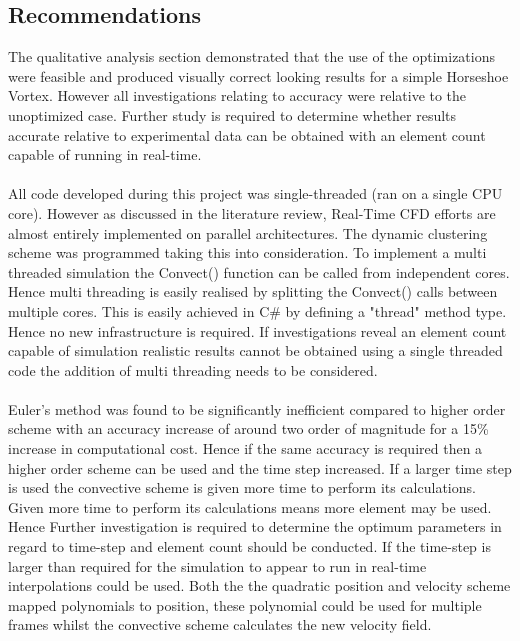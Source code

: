 \subsection{Recommendations}
The qualitative analysis section demonstrated that the use of the optimizations were feasible and produced visually correct looking results for a simple Horseshoe Vortex. However all investigations relating to accuracy were relative to the unoptimized case. Further study is required to determine whether results accurate relative to experimental data can be obtained with an element count capable of running in real-time.
\\\\
All code developed during this project was single-threaded (ran on a single CPU core). However as discussed in the literature review, Real-Time CFD efforts are almost entirely implemented on parallel architectures. The dynamic clustering scheme was programmed taking this into consideration. To implement a multi threaded simulation the Convect() function can be called from independent cores. Hence multi threading is easily realised by splitting the Convect() calls between multiple cores. This is easily achieved in C\# by defining a "thread" method type. Hence no new infrastructure is required. If investigations reveal an element count capable of simulation realistic results cannot be obtained using a single threaded code the addition of multi threading needs to be considered.
\\\\
Euler's method was found to be significantly inefficient compared to higher order scheme with an accuracy increase of around two order of magnitude for a 15\% increase in computational cost. Hence if the same accuracy is required then a higher order scheme can be used and the time step increased. If a larger time step is used the convective scheme is given more time to perform its calculations. Given more time to perform its calculations means more element may be used. Hence Further investigation is required to determine the optimum parameters in regard to time-step and element count should be conducted. If the time-step is larger than required for the simulation to appear to run in real-time interpolations could be used. Both the the quadratic position and velocity scheme mapped polynomials to position, these polynomial could be used for multiple frames whilst the convective scheme calculates the new velocity field.




